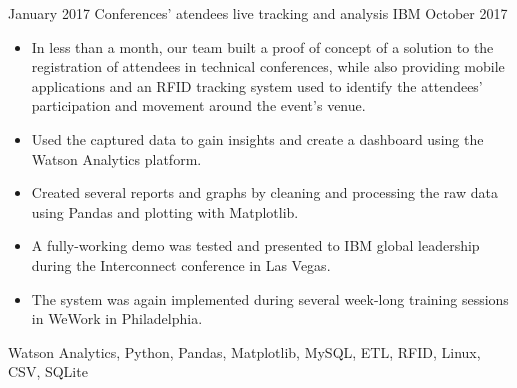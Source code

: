 %
%
%


\begin{projects}

    \project
        {January 2017}
        {Conferences' atendees live tracking and analysis}
        {IBM}
        {October 2017}
        {
            \begin{itemize}
                \item In less than a month, our team built a proof of concept 
                    of a solution to the registration of attendees in technical 
                    conferences, while also providing mobile applications and 
                    an RFID tracking system used to identify the attendees' 
                    participation and movement around the event's venue.
                \item Used the captured data to gain insights and create a 
                    dashboard using the Watson Analytics platform.
                \item Created several reports and graphs by cleaning and 
                    processing the raw data using Pandas and plotting with 
                    Matplotlib.
                \item A fully-working demo was tested and presented to IBM 
                    global leadership during the Interconnect conference in Las 
                    Vegas.
                \item The system was again implemented during several 
                    week-long training sessions in WeWork in Philadelphia.
            \end{itemize}
        }
        {
            Watson Analytics,
            Python,
            Pandas,
            Matplotlib,
            MySQL,
            ETL,
            RFID, 
            Linux,
            CSV,
            SQLite
        }

    \emptySeparator


\end{projects}
